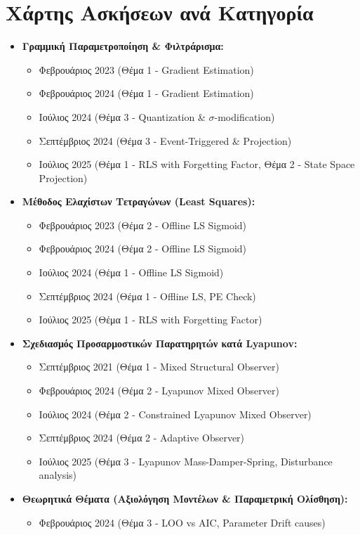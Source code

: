 \documentclass[a4paper,11pt]{article}
\begin{document}
\section*{Χάρτης Ασκήσεων ανά Κατηγορία}

\begin{itemize}
    \item \textbf{Γραμμική Παραμετροποίηση \& Φιλτράρισμα:}
    \begin{itemize}
        \item Φεβρουάριος 2023 (Θέμα 1 - Gradient Estimation)
        \item Φεβρουάριος 2024 (Θέμα 1 - Gradient Estimation)
        \item Ιούλιος 2024 (Θέμα 3 - Quantization \& $\sigma$-modification)
        \item Σεπτέμβριος 2024 (Θέμα 3 - Event-Triggered \& Projection)
        \item Ιούλιος 2025 (Θέμα 1 - RLS with Forgetting Factor, Θέμα 2 - State Space Projection)
    \end{itemize}
    \item \textbf{Μέθοδος Ελαχίστων Τετραγώνων (Least Squares):}
    \begin{itemize}
        \item Φεβρουάριος 2023 (Θέμα 2 - Offline LS Sigmoid)
        \item Φεβρουάριος 2024 (Θέμα 2 - Offline LS Sigmoid)
        \item Ιούλιος 2024 (Θέμα 1 - Offline LS Sigmoid)
        \item Σεπτέμβριος 2024 (Θέμα 1 - Offline LS, PE Check)
        \item Ιούλιος 2025 (Θέμα 1 - RLS with Forgetting Factor)
    \end{itemize}
    \item \textbf{Σχεδιασμός Προσαρμοστικών Παρατηρητών κατά Lyapunov:}
    \begin{itemize}
        \item Σεπτέμβριος 2021 (Θέμα 1 - Mixed Structural Observer)
        \item Φεβρουάριος 2024 (Θέμα 2 - Lyapunov Mixed Observer)
        \item Ιούλιος 2024 (Θέμα 2 - Constrained Lyapunov Mixed Observer)
        \item Σεπτέμβριος 2024 (Θέμα 2 - Adaptive Observer)
        \item Ιούλιος 2025 (Θέμα 3 - Lyapunov Mass-Damper-Spring, Disturbance analysis)
    \end{itemize}
    \item \textbf{Θεωρητικά Θέματα (Αξιολόγηση Μοντέλων \& Παραμετρική Ολίσθηση):}
    \begin{itemize}
        \item Φεβρουάριος 2024 (Θέμα 3 - LOO vs AIC, Parameter Drift causes)
    \end{itemize}
\end{itemize}
\end{document}
